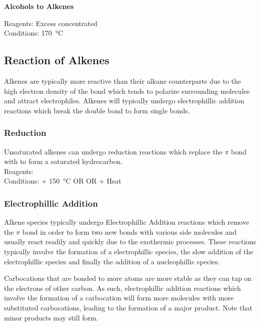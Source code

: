 \documentclass[../main]{subfiles}
\begin{document}
	\noindent \textbf{Alcohols to Alkenes} 

	Reagents: Excess concentrated  \\
	Conditions: \SI{170}{\celsius} \\

	\subsection{Reaction of Alkenes}
	
	Alkenes are typically more reactive than their alkane counterparts due to the high electron density of the  bond which tends to polarize surrounding molecules and attract electrophiles. Alkenes will typically undergo electrophillic addition reactions which break the double bond to form single bonds.

	\subsubsection{Reduction}

	Unsaturated alkenes can undergo reduction reactions which replace the  \(\pi\) bond with  to form a saturated hydrocarbon. \\

	Reagents:  \\
	Conditions:  + \SI{150}{\celsius} OR  OR  + Heat\\

	\subsubsection{Electrophillic Addition}

	Alkene species typically undergo Electrophillic Addition reactions which remove the  \(\pi\) bond in order to form two new bonds with various side molecules and usually react readily and quickly due to the exothermic processes. These reactions typically involve the formation of a electrophillic species, the slow addition of the electrophillic species and finally the addition of a nucleophillic species.

	Carbocations that are bonded to more  atoms are more stable as they can tap on the electrons of other carbon. As such, electrophillic addition reactions which involve the formation of a carbocation will form more molecules with more substituted carbocations, leading to the formation of a major product. Note that minor products may still form. \\
\end{document}
